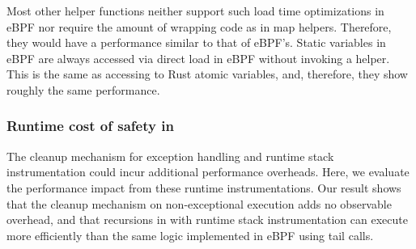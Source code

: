 Most other helper functions neither support such load time
    optimizations in eBPF nor require the amount of wrapping code as in
    map helpers.
Therefore, they would have a performance similar to that of eBPF's.
Static variables in eBPF are always accessed via direct load in eBPF without
    invoking a helper.
This is the same as accessing to Rust atomic variables, and, therefore, they
    show roughly the same performance.



\subsubsection{Runtime cost of safety in \projname{}}
The cleanup mechanism for exception handling and runtime stack instrumentation
    could incur additional performance overheads.
Here, we evaluate the performance impact from these runtime instrumentations.
Our result shows that the cleanup mechanism on non-exceptional execution adds
    no observable overhead, and that recursions in \projname{} with runtime
    stack instrumentation can execute more efficiently than the same logic
    implemented in eBPF using tail calls.

